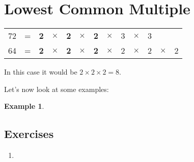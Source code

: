 \documentclass[11pt, oneside]{article}
\theoremstyle{definition}
\newtheorem{exmp}{Example}[section]
\begin{document}
\section{Lowest Common Multiple}



\begin{tabular}{c c c c c c c c c c c c c}
72 & = & {\bf2} & $\times $ & {\bf2} & $\times$  & {\bf2} & $\times$ & 3 & $\times $ & 3  &  &  \\
64 & = & {\bf2} & $\times $ & {\bf2} & $\times$  & {\bf2} & $\times$ & 2 & $\times $ & 2 & $\times $ & 2
\end{tabular}

In this case it would be $2\times 2\times 2 = 8$.



Let's now look at some examples:

\begin{exmp} \end{exmp}


\subsection{Exercises}
\begin{enumerate}
\item 
\end{enumerate}
\end{document}
